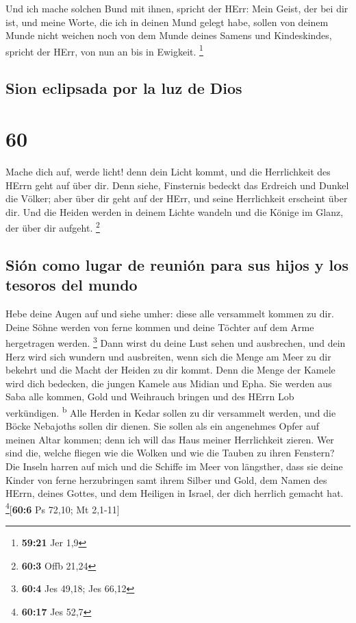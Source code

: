  Und ich mache solchen Bund mit ihnen, spricht der HErr:
Mein Geist, der bei dir ist, und meine Worte, die ich in deinen Mund
gelegt habe, sollen von deinem Munde nicht weichen noch von dem Munde
deines Samens und Kindeskindes, spricht der HErr, von nun an bis in
Ewigkeit. \footnote{\textbf{59:21} Jer 1,9}

\hypertarget{sion-eclipsada-por-la-luz-de-dios}{%
\subsection{Sion eclipsada por la luz de
Dios}\label{sion-eclipsada-por-la-luz-de-dios}}

\hypertarget{section-59}{%
\section{60}\label{section-59}}

 Mache dich auf, werde licht! denn dein Licht kommt, und
die Herrlichkeit des HErrn geht auf über dir.  Denn siehe,
Finsternis bedeckt das Erdreich und Dunkel die Völker; aber über dir
geht auf der HErr, und seine Herrlichkeit erscheint über dir.
 Und die Heiden werden in deinem Lichte wandeln und die
Könige im Glanz, der über dir aufgeht. \footnote{\textbf{60:3} Offb
  21,24}

\hypertarget{siuxf3n-como-lugar-de-reuniuxf3n-para-sus-hijos-y-los-tesoros-del-mundo}{%
\subsection{Sión como lugar de reunión para sus hijos y los tesoros del
mundo}\label{siuxf3n-como-lugar-de-reuniuxf3n-para-sus-hijos-y-los-tesoros-del-mundo}}

 Hebe deine Augen auf und siehe umher: diese alle
versammelt kommen zu dir. Deine Söhne werden von ferne kommen und deine
Töchter auf dem Arme hergetragen werden. \footnote{\textbf{60:4} Jes
  49,18; Jes 66,12}  Dann wirst du deine Lust sehen und
ausbrechen, und dein Herz wird sich wundern und ausbreiten, wenn sich
die Menge am Meer zu dir bekehrt und die Macht der Heiden zu dir kommt.
 Denn die Menge der Kamele wird dich bedecken, die jungen
Kamele aus Midian und Epha. Sie werden aus Saba alle kommen, Gold und
Weihrauch bringen und des HErrn Lob verkündigen. \textsuperscript{b}
 Alle Herden in Kedar sollen zu dir versammelt werden, und
die Böcke Nebajoths sollen dir dienen. Sie sollen als ein angenehmes
Opfer auf meinen Altar kommen; denn ich will das Haus meiner
Herrlichkeit zieren.  Wer sind die, welche fliegen wie die
Wolken und wie die Tauben zu ihren Fenstern?  Die Inseln
harren auf mich und die Schiffe im Meer von längsther, dass sie deine
Kinder von ferne herzubringen samt ihrem Silber und Gold, dem Namen des
HErrn, deines Gottes, und dem Heiligen in Israel, der dich herrlich
gemacht hat. \footnote{\textbf{60:17} Jes 52,7}{[}\textbf{60:6} Ps
72,10; Mt 2,1-11{]}

